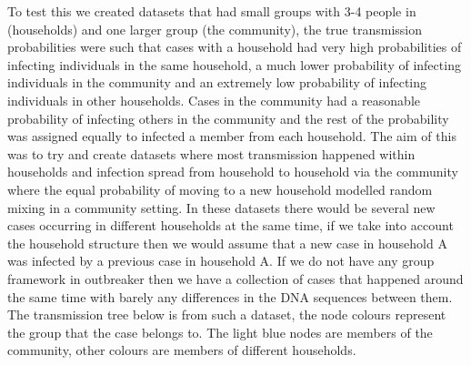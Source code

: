 \documentclass[11pt,a4paper]{report}
\begin{document}
\begin{center}
\end{center}
To test this we created datasets that had small groups with 3-4 people in (households) and one larger group (the community), the true transmission probabilities were such that cases with a household had very high probabilities of infecting individuals in the same household, a much lower probability of infecting individuals in the community and an extremely low probability of infecting individuals in other households. Cases in the community had a reasonable probability of infecting others in the community and the rest of the probability was assigned equally to infected a member from each household. The aim of this was to try and create datasets where most transmission happened within households and infection spread from household to household via the community where the equal probability of moving to a new household modelled random mixing in a community setting. In these datasets there would be several new cases occurring in different households at the same time, if we take into account the household structure then we would assume that a new case in household A was infected by a previous case in household A. If we do not have any group framework in outbreaker then we have a collection of cases that happened around the same time with barely any differences in the DNA sequences between them. The transmission tree below is from such a dataset, the node colours represent the group that the case belongs to. The light blue nodes are members of the community, other colours are members of different households.
\end{document}
